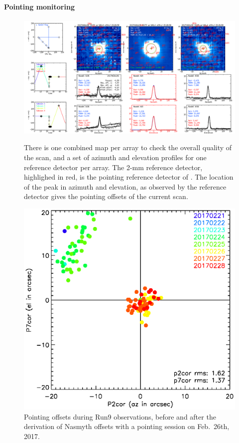 \paragraph{Pointing monitoring}

\begin{figure}[p]
\begin{center}
\includegraphics[clip, angle=0, scale = 0.30]{Figures/plot_20170418s192.png}
\caption[Summary plots of the reduction of pointing scan.]{There is one combined
  map per array to check the overall quality of the scan, and a set of azimuth
  and elevation profiles for one reference detector per array. The 2-mm reference
  detector, highlighed in red, is the pointing reference detector of
  \nika. The location of the peak in azimuth and elevation, as observed by the
  reference detector gives the pointing offsets of the current scan.}
\label{fig:ptg}
\end{center}
\begin{center}
\includegraphics[clip, angle=0, scale = 0.70]{Figures/pointing_stats_N2R9.eps}
\caption[Pointing session results]{Pointing offsets during Run9 observations, before and after the
  derivation of Nasmyth offsets with a pointing session on Feb.~26th, 2017.}
\label{fig:pointing_stats_n2r9}
\end{center}
\end{figure}

